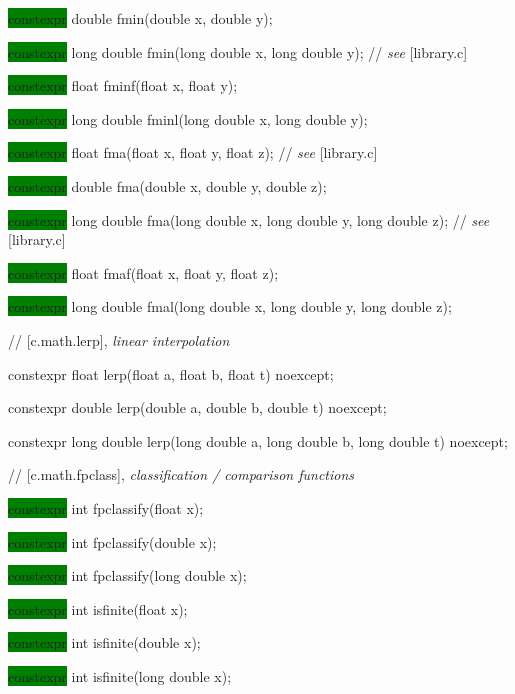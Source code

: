 \documentclass[prd,twocolumn,amsmath,amssymb,nofootinbib,eqsecnum]{revtex4-1}
\newcommand{\highlight}[1]{\colorbox{green}{\!\!\!\! #1}}
\newcommand{\stdcomment}[1]{{// {\it see} [#1]}}
\begin{document}
{\highlight{constexpr}  double fmin(double x, double y);

\highlight{constexpr}  long double fmin(long double x, long double y); \stdcomment{library.c}

\highlight{constexpr}  float fminf(float x, float y);

\highlight{constexpr} long double fminl(long double x, long double y);

\vspace{2ex}

\highlight{constexpr}  float fma(float x, float y, float z); \stdcomment{library.c}

\highlight{constexpr}  double fma(double x, double y, double z);

\highlight{constexpr}  long double fma(long double x, long double y, long double z); \stdcomment{library.c}

\highlight{constexpr}  float fmaf(float x, float y, float z);

\highlight{constexpr}  long double fmal(long double x, long double y, long double z);

\vspace{2ex}

// [c.math.lerp], {\it linear interpolation}

\vspace{2ex}

constexpr float lerp(float a, float b, float t) noexcept;

constexpr double lerp(double a, double b, double t) noexcept;

constexpr long double lerp(long double a, long double b, long double t) noexcept;

\vspace{2ex}

// [c.math.fpclass], {\it classification / comparison functions}

\highlight{constexpr} int fpclassify(float x);

\highlight{constexpr} int fpclassify(double x);

\highlight{constexpr} int fpclassify(long double x);

\vspace{2ex}

\highlight{constexpr} int isfinite(float x);

\highlight{constexpr} int isfinite(double x);

\highlight{constexpr} int isfinite(long double x);

\vspace{2ex}

}
\end{document}

